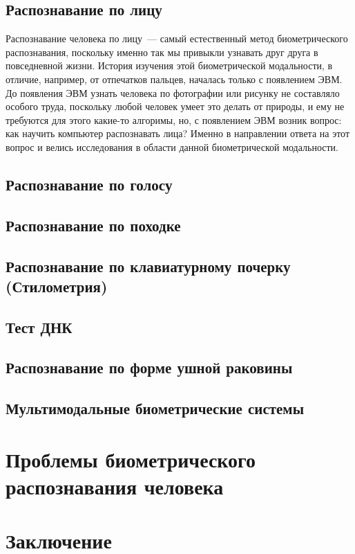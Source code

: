 \documentclass[14pt, a4paper]{extarticle}
\begin{document}
\subsection{Распознавание по лицу}
Распознавание человека по лицу~--- самый естественный метод биометрического распознавания, поскольку именно так мы привыкли узнавать друг друга в повседневной жизни. История изучения этой биометрической модальности, в отличие, например, от отпечатков пальцев, началась только с появлением ЭВМ. До появления ЭВМ узнать человека по фотографии или рисунку не составляло особого труда, поскольку любой человек умеет это делать от природы, и ему не требуются для этого какие-то алгоримы, но, с появлением ЭВМ возник вопрос: как научить компьютер распознавать лица? Именно в направлении ответа на этот вопрос и велись исследования в области данной биометрической модальности.


\subsection{Распознавание по голосу}
\subsection{Распознавание по походке}
\subsection{Распознавание по клавиатурному почерку (Стилометрия)}
\subsection{Тест ДНК}
\subsection{Распознавание по форме ушной раковины}
\subsection{Мультимодальные биометрические системы}

\newpage
\section{Проблемы биометрического распознавания человека}

\newpage
\section{Заключение}
	
\newpage

\end{document}
